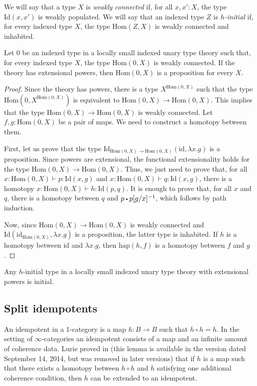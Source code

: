 \documentclass[reqno]{mscs}
\newcommand{\fs}[1]{\mathrm{#1}}
\newcommand{\Hom}{\fs{Hom}}
\newcommand{\Id}{\fs{Id}}
\newcommand{\sym}[1]{#1^{-1}}
\newcommand{\id}{\fs{id}}
\numberwithin{figure}{section}
\newcommand{\ct}{%
  \mathchoice{\mathbin{\raisebox{0.25ex}{$\displaystyle\centerdot$}}}%
             {\mathbin{\raisebox{0.25ex}{$\centerdot$}}}%
             {\mathbin{\raisebox{0.25ex}{$\scriptstyle\,\centerdot\,$}}}%
             {\mathbin{\raisebox{0.25ex}{$\scriptscriptstyle\,\centerdot\,$}}}
}
\begin{document}
We will say that a type $X$ is \emph{weakly connected} if, for all $x, x' : X$, the type $\Id(x,x')$ is weakly populated.
We will say that an indexed type $Z$ is \emph{$h$-initial} if, for every indexed type $X$, the type $\Hom(Z,X)$ is weakly connected and inhabited.

\begin{prop}
Let $0$ be an indexed type in a locally small indexed unary type theory such that, for every indexed type $X$, the type $\Hom(0,X)$ is weakly connected.
If the theory has extensional powers, then $\Hom(0,X)$ is a proposition for every $X$.
\end{prop}
\begin{proof}
Since the theory has powers, there is a type $X^{\Hom(0,X)}$ such that the type $\Hom(0,X^{\Hom(0,X)})$ is equivalent to $\Hom(0,X) \to \Hom(0,X)$.
This implies that the type $\Hom(0,X) \to \Hom(0,X)$ is weakly connected.
Let $f,g : \Hom(0,X)$ be a pair of maps.
We need to construct a homotopy between them.

First, let us prove that the type $\Id_{\Hom(0,X) \to \Hom(0,X)}(\id, \lambda x.g)$ is a proposition.
Since powers are extensional, the functional extensionality holds for the type $\Hom(0,X) \to \Hom(0,X)$.
Thus, we just need to prove that, for all $x : \Hom(0,X) \vdash p : \Id(x,g)$ and $x : \Hom(0,X) \vdash q : \Id(x,g)$, there is a homotopy $x : \Hom(0,X) \vdash h : \Id(p,q)$.
It is enough to prove that, for all $x$ and $q$, there is a homotopy between $q$ and $p \ct \sym{p[g/x]}$, which follows by path induction.

Now, since $\Hom(0,X) \to \Hom(0,X)$ is weakly connected and $\Id(\id_{\Hom(0,X)}, \lambda x.g)$ is a proposition, the latter type is inhabited.
If $h$ is a homotopy between $\id$ and $\lambda x.g$, then $\fs{hap}(h,f)$ is a homotopy between $f$ and $g$.
\end{proof}

\begin{cor}
Any $h$-initial type in a locally small indexed unary type theory with extensional powers is initial.
\end{cor}

\subsection{Split idempotents}

An idempotent in a 1-category is a map $h : B \to B$ such that $h \circ h = h$.
In the setting of $\infty$-categories an idempotent consists of a map and an infinite amount of coherence data.
Lurie proved in \cite[Lemma~7.3.5.14]{lurie-algebra} (this lemma is available in the version dated September 14, 2014, but was removed in later versions)
that if $h$ is a map such that there exists a homotopy between $h \circ h$ and $h$ satisfying one additional coherence condition, then $h$ can be extended to an idempotent.
\end{document}
